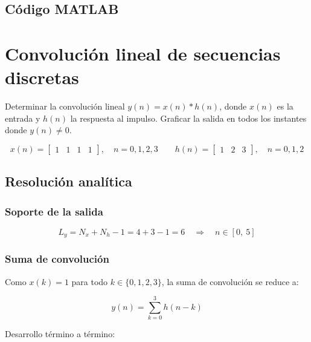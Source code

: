 \documentclass[../Main_Include.tex]{subfiles}
\begin{document}
\subsection*{Código MATLAB}



\newpage
\section{Convolución lineal de secuencias discretas}

Determinar la convolución lineal $y(n) = x(n) * h(n)$, donde $x(n)$ es la
entrada y $h(n)$ la respuesta al impulso. Graficar la salida en todos los
instantes donde $y(n) \neq 0$.

\[
    x(n) = \begin{bmatrix} 1 & 1 & 1 & 1 \end{bmatrix}, \quad n = 0,1,2,3
    \qquad
    h(n) = \begin{bmatrix} 1 & 2 & 3 \end{bmatrix}, \quad n = 0,1,2
\]

\subsection*{Resolución analítica}

\subsubsection*{Soporte de la salida}

\[
    L_y = N_x + N_h - 1 = 4 + 3 - 1 = 6
    \quad\Rightarrow\quad n \in [0,\ 5]
\]

\subsubsection*{Suma de convolución}

Como $x(k) = 1$ para todo $k \in \{0,1,2,3\}$, la suma de convolución
se reduce a:

\[
    y(n) = \sum_{k=0}^{3} h(n-k)
\]

Desarrollo término a término:
\end{document}
